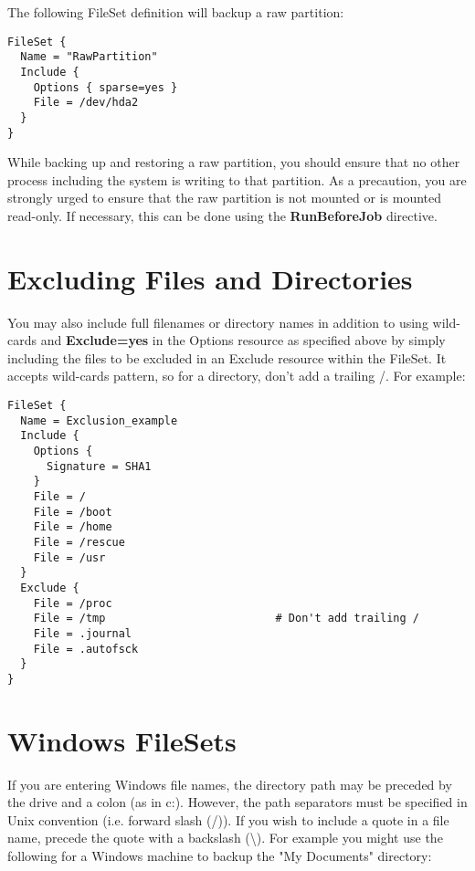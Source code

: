 The following FileSet definition will backup a raw partition: 

\footnotesize
\begin{verbatim}
FileSet {
  Name = "RawPartition"
  Include {
    Options { sparse=yes }
    File = /dev/hda2
  }
}
\end{verbatim}
\normalsize

While backing up and restoring a raw partition, you should ensure that no
other process including the system is writing to that partition. As a
precaution, you are strongly urged to ensure that the raw partition is not
mounted or is mounted read-only. If necessary, this can be done using the {\bf
RunBeforeJob} directive. 


\section{Excluding Files and Directories}

You may also include full filenames or directory names in addition to using
wild-cards and {\bf Exclude=yes} in the Options resource as specified above by
simply including the files to be excluded in an Exclude resource within the
FileSet. It accepts wild-cards pattern, so for a directory, don't add a trailing
/. For example:

\footnotesize
\begin{verbatim}
FileSet {
  Name = Exclusion_example
  Include {
    Options {
      Signature = SHA1
    }
    File = /
    File = /boot
    File = /home
    File = /rescue
    File = /usr
  }
  Exclude {
    File = /proc
    File = /tmp                          # Don't add trailing /
    File = .journal
    File = .autofsck
  }
}
\end{verbatim}
\normalsize

\label{win32}
\section{Windows FileSets}
If you are entering Windows file names, the directory path may be preceded by
the drive and a colon (as in c:). However, the path separators must be
specified in Unix convention (i.e. forward slash (/)). If you wish to include
a quote in a file name, precede the quote with a backslash
(\textbackslash{}). For example you might use the following
for a Windows machine to backup the "My Documents" directory: 

